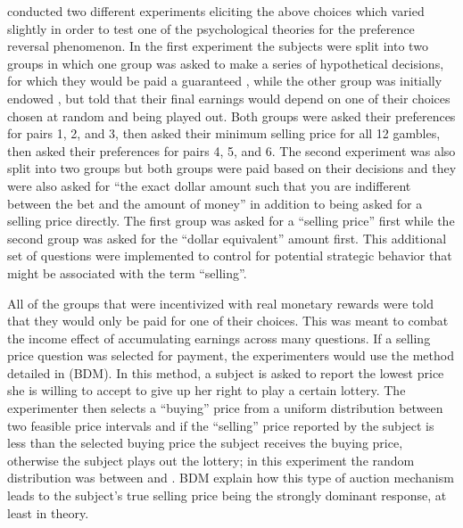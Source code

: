 \documentclass[../main.tex]{subfiles}
\begin{document}
\textcite{Grether1979} conducted two different experiments eliciting the above choices which  varied slightly in order to test one of the psychological theories for the preference reversal phenomenon.
In the first experiment the subjects were split into two groups in which one group was asked to make a series of hypothetical decisions, for which they would be paid a guaranteed , while the other group was initially endowed , but told that their final earnings would depend on one of their choices chosen at random and being played out.
Both groups were asked their preferences for pairs 1, 2, and 3, then asked their minimum selling price for all 12 gambles, then asked their preferences for pairs 4, 5, and 6.
The second experiment was also split into two groups but both groups were paid based on their decisions and they were also asked for \enquote{the exact dollar amount such that you are indifferent between the bet and the amount of money} in addition to being asked for a selling price directly.
The first group was asked for a \enquote{selling price} first while the second group was asked for the \enquote{dollar equivalent} amount first.
This additional set of questions were implemented to control for potential strategic behavior that might be associated with the term \enquote{selling}.

All of the groups that were incentivized with real monetary rewards were told that they would only be paid for one of their choices.
This was meant to combat the income effect of accumulating earnings across many questions.
If a selling price question was selected for payment, the experimenters would use the method detailed in \textcite{Becker1964} (BDM).
In this method, a subject is asked to report the lowest price she is willing to accept to give up her right to play a certain lottery.
The experimenter then selects a \enquote{buying} price from a uniform distribution between two feasible price intervals and if the \enquote{selling} price reported by the subject is less than the selected buying price the subject receives the buying price, otherwise the subject plays out the lottery; in this experiment the random distribution was between  and .
BDM explain how this type of auction mechanism leads to the subject's true selling price being the strongly dominant response, at least in theory.
\end{document}
